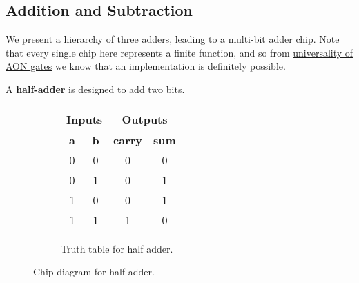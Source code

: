 \subsection{Addition and Subtraction} 

  We present a hierarchy of three adders, leading to a multi-bit adder chip. Note that every single chip here represents a finite function, and so from  \hyperref[th-thm:aon_univ]{universality of AON gates} we know that an implementation is definitely possible. 
  
  \begin{definition} 
    A \textbf{half-adder} is designed to add two bits. 

    \begin{figure}[H]
      \centering
      \begin{subfigure}[b]{0.48\textwidth}
        \centering
        \begin{tabular}{|c|c||c|c|}
          \hline
          \multicolumn{2}{|c||}{\textbf{Inputs}} & \multicolumn{2}{c|}{\textbf{Outputs}} \\
          \hline
          \textbf{a} & \textbf{b} & \textbf{carry} & \textbf{sum} \\
          \hline
          0 & 0 & 0 & 0 \\
          \hline
          0 & 1 & 0 & 1 \\
          \hline
          1 & 0 & 0 & 1 \\
          \hline
          1 & 1 & 1 & 0 \\
          \hline
        \end{tabular}
        \caption{Truth table for half adder.}
      \end{subfigure}
      \hfill 
      \begin{subfigure}[b]{0.48\textwidth}
        \centering
        \caption{}
      \end{subfigure}
      \caption{Chip diagram for half adder.}
    \end{figure}
  \end{definition}

